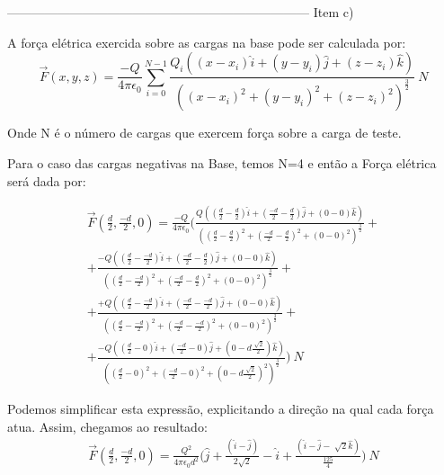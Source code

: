 \documentclass[journal,comsoc]{IEEEtran}
\begin{document}
------------------------------------------------------------------------
Item c)
\par A força elétrica exercida sobre as cargas na base pode ser calculada por:
\begin{equation}
    	\vec{F}(x,y,z) = \frac{-Q}{4\pi{\epsilon}_{0}} \sum_{i=0}^{N-1}
        \frac
        {{Q}_{i} ((x-{x}_{i})\hat{i}+(y-{y}_{i})\hat{j}+(z-{z}_{i})\hat{k})} 
        {((x-{x}_{i})^2+(y-{y}_{i})^2+(z-{z}_{i})^2)^\frac{3}{2}}\ N
\end{equation}
\par Onde N é o número de cargas que exercem força sobre a carga de teste.

\par Para o caso das cargas negativas na Base, temos N=4 e então a Força elétrica será dada por:

\begin{equation}
\begin{aligned}
    	\vec{F}(\frac{d}{2},\frac{-d}{2},0)
        = 
        \frac{-Q}{4\pi{\epsilon}_{0}}
        \Big(
        \frac
        {Q((\frac{d}{2}-\frac{d}{2})\hat{i}+(\frac{-d}{2}-\frac{d}{2})\hat{j}+(0-0)\hat{k})} 
        {((\frac{d}{2}-\frac{d}{2})^2+(\frac{-d}{2}-\frac{d}{2})^2+(0-0)^2)^\frac{3}{2}} +
     	\\
	+   \frac
        {-Q((\frac{d}{2}-\frac{-d}{2})\hat{i}+(\frac{-d}{2}-\frac{d}{2})\hat{j}+(0-0)\hat{k})} 
        {((\frac{d}{2}-\frac{-d}{2})^2+(\frac{-d}{2}-\frac{d}{2})^2+(0-0)^2)^\frac{3}{2}} +
        \\
    +   \frac
        {+Q((\frac{d}{2}-\frac{-d}{2})\hat{i}+(\frac{-d}{2}-\frac{-d}{2})\hat{j}+(0-0)\hat{k})} 
        {((\frac{d}{2}-\frac{-d}{2})^2+(\frac{-d}{2}-\frac{-d}{2})^2+(0-0)^2)^\frac{3}{2}} +
        \\
    +   \frac
        {-Q((\frac{d}{2}-0)\hat{i}+(\frac{-d}{2}-0)\hat{j}+(0-d\frac{\sqrt[]{2}}{2})\hat{k})} 
        {((\frac{d}{2}-0)^2+(\frac{-d}{2}-0)^2+(0-d\frac{\sqrt[]{2}}{2})^2)^\frac{3}{2}}
    \Big)\ N
\end{aligned}
\end{equation}

\par Podemos simplificar esta expressão, explicitando a direção na qual cada força atua. Assim, chegamos ao resultado:
\begin{equation}
\begin{aligned}
    	\vec{F}(\frac{d}{2},\frac{-d}{2},0)
        = 
   \frac{Q^2}{4\pi{\epsilon}_{0}d^2}
        \Big(
        \hat{j} +
   \frac
        {(\hat{i}-\hat{j})} 
        {2\sqrt{2}}
   -\hat{i} +
   \frac
        {(\hat{i}-\hat{j}-\sqrt[]{2}\hat{k})} 
        {\frac{125}{4}}
    \Big)\ N
\end{aligned}
\end{equation}
\end{document}
